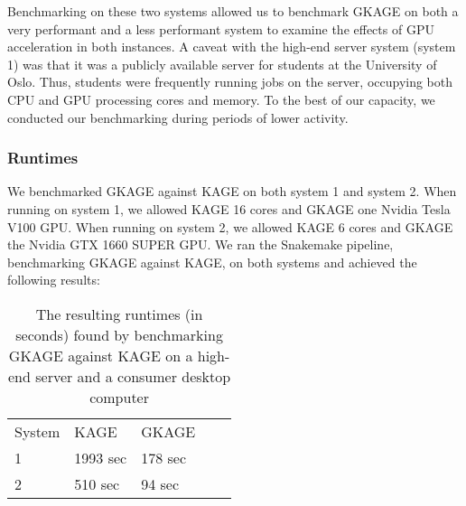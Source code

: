 Benchmarking on these two systems allowed us to benchmark GKAGE on both a very performant and a less performant system to examine the effects of GPU acceleration in both instances.
A caveat with the high-end server system (system 1) was that it was a publicly available server for students at the University of Oslo.
Thus, students were frequently running jobs on the server, occupying both CPU and GPU processing cores and memory.
To the best of our capacity, we conducted our benchmarking during periods of lower activity.

\subsubsection{Runtimes}
We benchmarked GKAGE against KAGE on both system 1 and system 2.
When running on system 1, we allowed KAGE 16 cores and GKAGE one Nvidia Tesla V100 GPU.
When running on system 2, we allowed KAGE 6 cores and GKAGE the Nvidia GTX 1660 SUPER GPU.
We ran the Snakemake pipeline, benchmarking GKAGE against KAGE, on both systems and achieved the following results:

\begin{table}[H]
\begin{center}
\begin{tabular}{lllll}
\multicolumn{1}{l|}{System} & \multicolumn{1}{l}{KAGE}     & \multicolumn{1}{l}{GKAGE} &  \\ \cline{1-3}
\multicolumn{1}{l|}{1}      & \multicolumn{1}{l}{1993 sec} & \multicolumn{1}{l}{178 sec} &  \\
\multicolumn{1}{l|}{2}      & \multicolumn{1}{l}{510 sec}  & \multicolumn{1}{l}{94 sec} &  \\
\end{tabular}
\end{center}
\caption{
  The resulting runtimes (in seconds) found by benchmarking GKAGE against KAGE on a high-end server and a consumer desktop computer
}
\label{results:benchmarking:tables:runtimes}
\end{table}

